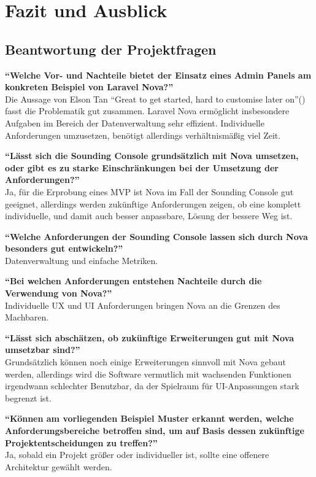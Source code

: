 \section{Fazit und Ausblick}

\subsection{Beantwortung der Projektfragen}

\textbf{\enquote{Welche Vor- und Nachteile bietet der Einsatz eines Admin Panels am konkreten Beispiel von Laravel Nova?}}\\
Die Aussage von Elson Tan \enquote{Great to get started, hard to customise later on}(\cite{laravel-nova-in-production-one-year-later}) fasst die Problematik gut zusammen.
Laravel Nova ermöglicht insbesondere Aufgaben im Bereich der Datenverwaltung sehr effizient.
Individuelle Anforderungen umzusetzen, benötigt allerdings verhältnismäßig viel Zeit.

\textbf{\enquote{Lässt sich die Sounding Console grundsätzlich mit Nova umsetzen, oder gibt es zu starke Einschränkungen bei der Umsetzung der Anforderungen?}}\\
Ja, für die Erprobung eines MVP ist Nova im Fall der Sounding Console gut geeignet, allerdings werden zukünftige Anforderungen zeigen, ob eine komplett individuelle, und damit auch besser anpassbare, Lösung der bessere Weg ist.

\textbf{\enquote{Welche Anforderungen der Sounding Console lassen sich durch Nova besonders gut entwickeln?}}\\
Datenverwaltung und einfache Metriken.

\textbf{\enquote{Bei welchen Anforderungen entstehen Nachteile durch die Verwendung von Nova?}}\\
Individuelle UX und UI Anforderungen bringen Nova an die Grenzen des Machbaren.

\textbf{\enquote{Lässt sich abschätzen, ob zukünftige Erweiterungen gut mit Nova umsetzbar sind?}}\\
Grundsätzlich können noch einige Erweiterungen sinnvoll mit Nova gebaut werden, allerdings wird die Software vermutlich mit wachsenden Funktionen irgendwann schlechter Benutzbar, da der Spielraum für UI-Anpassungen stark begrenzt ist.

\textbf{\enquote{Können am vorliegenden Beispiel Muster erkannt werden, welche Anforderungsbereiche betroffen sind, um auf Basis dessen zukünftige Projektentscheidungen zu treffen?}}\\
Ja, sobald ein Projekt größer oder individueller ist, sollte eine offenere Architektur gewählt werden.

